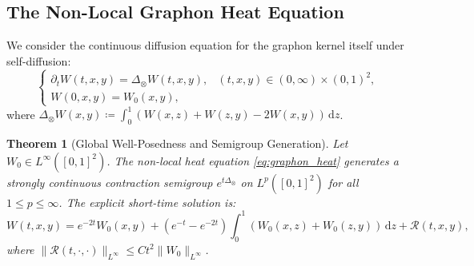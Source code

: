 \documentclass[11pt,a4paper,reqno]{amsart}
\newtheorem{theorem}{Theorem}[section]
\theoremstyle{definition}
\numberwithin{equation}{section}
\newcommand{\dif}{\,\mathrm{d}}
\begin{document}
\subsection{The Non-Local Graphon Heat Equation}
We consider the continuous diffusion equation for the graphon kernel itself under self-diffusion:
\begin{equation}
    \label{eq:graphon_heat}
    \begin{cases}
        \partial_t W(t, x, y) = \Delta_{\otimes} W(t, x, y), & (t, x, y) \in (0, \infty) \times (0, 1)^2, \\
        W(0, x, y) = W_0(x, y),
    \end{cases}
\end{equation}
where $\Delta_\otimes W(x, y) \coloneqq \int_0^1 (W(x, z) + W(z, y) - 2 W(x, y)) \dif z$.

\begin{theorem}[Global Well-Posedness and Semigroup Generation]
\label{thm:graphon_heat_existence}
Let $W_0 \in L^\infty([0, 1]^2)$. The non-local heat equation \eqref{eq:graphon_heat} generates a strongly continuous contraction semigroup $e^{t \Delta_\otimes}$ on $L^p([0, 1]^2)$ for all $1 \le p \le \infty$. The explicit short-time solution is:
\begin{equation}
    W(t, x, y) = e^{-2t} W_0(x, y) + (e^{-t} - e^{-2t}) \int_0^1 (W_0(x, z) + W_0(z, y)) \dif z + \mathcal{R}(t, x, y),
\end{equation}
where $\|\mathcal{R}(t, \cdot, \cdot)\|_{L^\infty} \le C t^2 \|W_0\|_{L^\infty}$.
\end{theorem}
\end{document}
